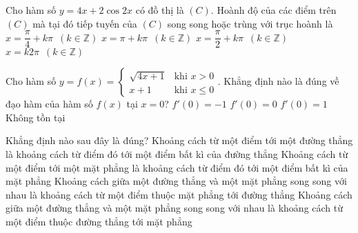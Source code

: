 \begin{ex}%
Cho hàm số $y = 4x + 2\cos 2x$ có đồ thị là $(C)$. Hoành độ của các điểm trên $(C)$ mà tại đó tiếp tuyến của $(C)$ song song hoặc trùng với trục hoành là
	\choice
	{\True $x = \dfrac{\pi}{4} + k\pi \enspace \left( k \in \mathbb{Z} \right)$}
	{$x = \pi  + k\pi \enspace \left( k \in \mathbb{Z} \right)$}
	{$x = \dfrac{\pi}{2} + k\pi \enspace \left( k \in \mathbb{Z} \right)$}
	{$x = k2\pi \enspace \left( k \in \mathbb{Z} \right)$}
\end{ex}

\begin{ex}%
Cho hàm số $ y=f(x)= \begin{cases} \sqrt{4x+1} & \text{khi } x>0 \\ x+1 & \text{khi } x \leq 0 \end{cases}$. Khẳng định nào là đúng về đạo hàm của hàm số $f(x)$ tại $x=0$?
	\choice
	{$f'\left( 0 \right) =  - 1$}
	{$f'\left( 0 \right) = 0$}
	{$f'\left( 0 \right) = 1$}
	{\True Không tồn tại}
\end{ex}

\begin{ex}%
Khẳng định nào sau đây là đúng?
	\choice
	{Khoảng cách từ một điểm tới một đường thẳng là khoảng cách từ điểm đó tới một điểm bất kì của đường thẳng}
	{Khoảng cách từ một điểm tới một mặt phẳng là khoảng cách từ điểm đó tới một điểm bất kì của mặt phẳng}
	{Khoảng cách giữa một đường thẳng và một mặt phẳng song song với nhau là khoảng cách từ một điểm thuộc mặt phẳng tới đường thẳng}
	{\True Khoảng cách giữa một đường thẳng và một mặt phẳng song song với nhau là khoảng cách từ một điểm thuộc đường thẳng tới mặt phẳng}
\end{ex}

